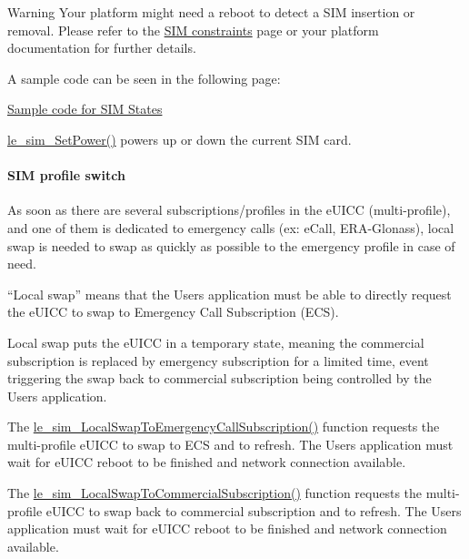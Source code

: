 \begin{DoxyWarning}{Warning}
Your platform might need a reboot to detect a S\+IM insertion or removal. Please refer to the \hyperlink{platformConstraintsSim}{S\+IM constraints} page or your platform documentation for further details.
\end{DoxyWarning}
A sample code can be seen in the following page\+:
\begin{DoxyItemize}
\item \hyperlink{c_simTestStates}{Sample code for S\+IM States}
\end{DoxyItemize}

\hyperlink{le__sim__interface_8h_a158c30712c4fd0afc06e66591eb89a6c}{le\+\_\+sim\+\_\+\+Set\+Power()} powers up or down the current S\+IM card.\hypertarget{c_sim_le_sim_profile_switch}{}\paragraph{S\+I\+M profile switch}\label{c_sim_le_sim_profile_switch}
As soon as there are several subscriptions/profiles in the e\+U\+I\+CC (multi-\/profile), and one of them is dedicated to emergency calls (ex\+: e\+Call, E\+R\+A-\/\+Glonass), local swap is needed to swap as quickly as possible to the emergency profile in case of need.

“\+Local swap” means that the User\textquotesingle{}s application must be able to directly request the e\+U\+I\+CC to swap to Emergency Call Subscription (E\+CS).

Local swap puts the e\+U\+I\+CC in a temporary state, meaning the commercial subscription is replaced by emergency subscription for a limited time, event triggering the swap back to commercial subscription being controlled by the User\textquotesingle{}s application.

The \hyperlink{le__sim__interface_8h_aa856f5e094e8182c8d0b07761e309549}{le\+\_\+sim\+\_\+\+Local\+Swap\+To\+Emergency\+Call\+Subscription()} function requests the multi-\/profile e\+U\+I\+CC to swap to E\+CS and to refresh. The User\textquotesingle{}s application must wait for e\+U\+I\+CC reboot to be finished and network connection available.

The \hyperlink{le__sim__interface_8h_a51b535750b66c4cf460e3c8c72f3658d}{le\+\_\+sim\+\_\+\+Local\+Swap\+To\+Commercial\+Subscription()} function requests the multi-\/profile e\+U\+I\+CC to swap back to commercial subscription and to refresh. The User\textquotesingle{}s application must wait for e\+U\+I\+CC reboot to be finished and network connection available.

